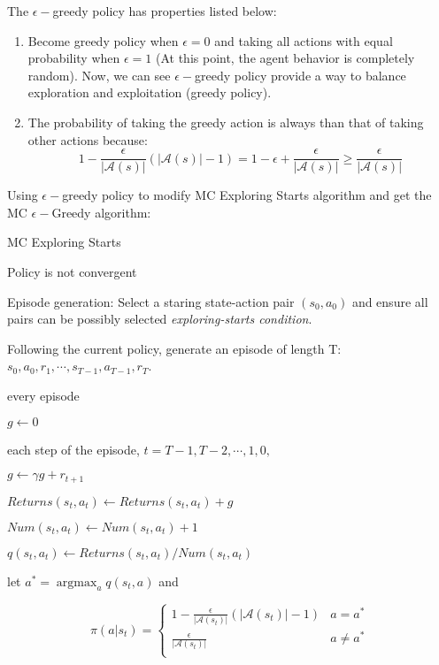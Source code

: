     The $\epsilon-$greedy policy has properties listed below:
    \begin{enumerate}

      \item
            Become greedy policy when $\epsilon=0$ and taking all actions with equal probability when $\epsilon=1$ (At this point, the agent behavior is completely
            random). Now, we can see $\epsilon-$greedy policy provide a way to balance exploration and exploitation (greedy policy).
      \item
            The probability of taking the greedy action is always than that of taking other actions because:
            \begin{equation*}
              1-\frac{\epsilon}{\left|\mathcal{A}(s)\right|}\left(\left|\mathcal{A}(s)\right|-1\right)=1-\epsilon+\frac{\epsilon}{\left|\mathcal{A}(s)\right|} \ge
              \frac{\epsilon}{\left|\mathcal{A}(s)\right|}
            \end{equation*}
    \end{enumerate}
    Using $\epsilon-$greedy policy to modify MC Exploring Starts algorithm and get the MC $\epsilon-$Greedy algorithm:
    \begin{algorithm}
      \caption{MC Exploring Starts}  
      \While
      {Policy is not convergent}{ Episode generation: Select a staring state-action pair $(s_{0},a_{0})$ and ensure all pairs can be possibly selected
      \emph{exploring-starts condition}. \par Following the current policy, generate an episode of length T: $s_{0},a_{0},r_{1},\cdots,s_{T-1},a_{T-1},r_{T}$.
      \par
      \For
      {every episode}{ $g \gets 0$ \par
      \For
      {each step of the episode, $t=T-1,T-2,\cdots,1,0,$}{ $g \gets \gamma g+r_{t+1}$ \par {} $Returns(s_{t},a_{t}) \gets
        Returns(s_{t},a_{t})+g$ \par $Num(s_{t},a_{t}) \gets Num(s_{t},a_{t})+1$ \par {} $q(s_{t},a_{t}) \gets Returns(s_{t},
        a_{t})/Num(s_{t},a_{t})$ \par {} let $a^{*}=\mathop{\arg \max}_{a}q(s_{t},a)$ and \par
      \begin{equation*}
        \pi(a|s_{t}) = \begin{cases} 1-\frac{\epsilon}{\left|\mathcal{A}(s_{t})\right|}\left(\left|\mathcal{A}(s_{t})\right|-1\right) & a = a^{*}    \\
              \frac{\epsilon}{\left|\mathcal{A}(s_{t})\right|}                                                 & a \neq a^{*} \\\end{cases}
      \end{equation*}
      }}}
    \end{algorithm}
